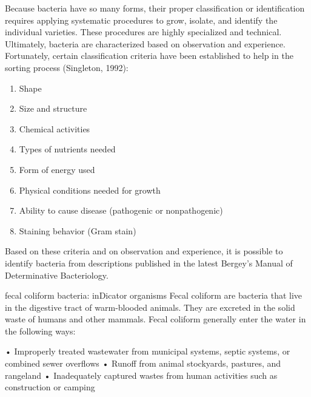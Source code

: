 \documentclass{article}
\begin{document}
Because bacteria have so many forms, their proper classification or
identification requires applying systematic procedures to grow, isolate,
and identify the individual varieties. These procedures are highly
specialized and technical. Ultimately, bacteria are characterized based
on observation and experience. Fortunately, certain classification
criteria have been established to help in the sorting process
(Singleton, 1992):

\begin{enumerate}
\item
  Shape
\item
  Size and structure
\item
  Chemical activities
\item
  Types of nutrients needed
\item
  Form of energy used
\item
  Physical conditions needed for growth
\item
  Ability to cause disease (pathogenic or nonpathogenic)
\item
  Staining behavior (Gram stain)
\end{enumerate}

Based on these criteria and on observation and experience, it is
possible to identify bacteria from descriptions published in the latest
Bergey's Manual of Determinative Bacteriology.

fecal coliform bacteria: inDicator organisms Fecal coliform are bacteria
that live in the digestive tract of warm-blooded animals. They are
excreted in the solid waste of humans and other mammals. Fecal coliform
generally enter the water in the following ways:

• Improperly treated wastewater from municipal systems, septic systems,
or combined sewer overflows • Runoff from animal stockyards, pastures,
and rangeland • Inadequately captured wastes from human activities such
as construction or camping
\end{document}

